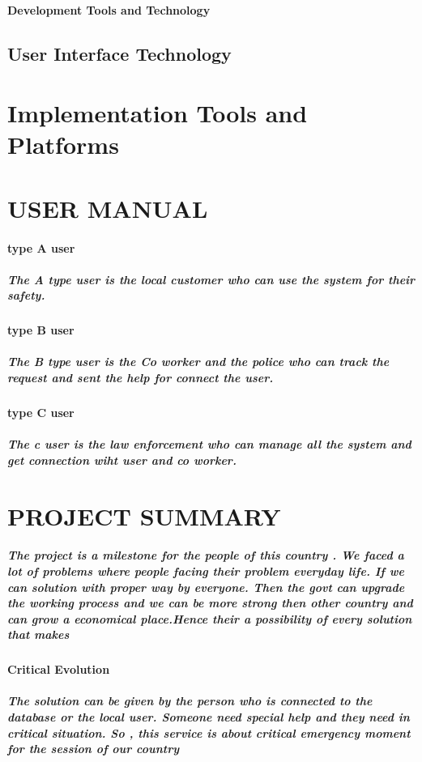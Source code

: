 \documentclass{article}
\begin{document}
\paragraph{Development Tools and Technology}
\subsection{User Interface Technology}
\section{Implementation Tools and Platforms}


\newpage
\section{USER MANUAL}


\paragraph{type A user}
\subparagraph{The A type user is the local customer who can use the system for their safety.}

\paragraph{type B user}
\subparagraph{The B type user is the Co worker and the police who can track the request and sent the help for connect the user. }

\paragraph{type C user}
\subparagraph{The c user is the law enforcement who can manage all the system and get connection wiht user and co worker.}

\newpage
\section{PROJECT SUMMARY}
\subparagraph{The project is a milestone for the people of this country . We faced a lot of problems where people facing their problem everyday life. If we can 
solution with proper way by everyone. Then the govt can upgrade the working process and we can be more strong then other country and can grow a economical place.Hence their a possibility of every solution that makes }
\paragraph{Critical Evolution}
\subparagraph{The solution can be given by the person who is connected to the database or the local user. Someone need special help and they need in critical situation. So , this service is about critical emergency moment for the session of our country}
\end{document}
